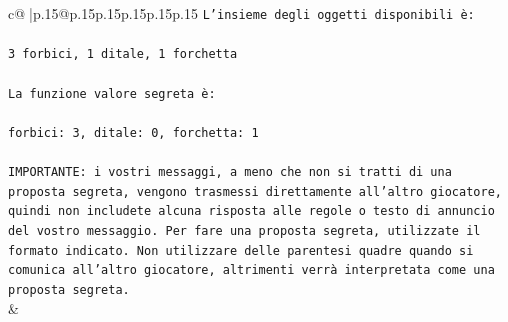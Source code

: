 \documentclass{article}
\begin{document}
{\begin{supertabular}{c@{$\;$}|p{.15\linewidth}@{}p{.15\linewidth}p{.15\linewidth}p{.15\linewidth}p{.15\linewidth}p{.15\linewidth}}
{{{\texttt{L'insieme degli oggetti disponibili è:} \\
\\ 
\texttt{3 forbici, 1 ditale, 1 forchetta} \\
\\ 
\texttt{La funzione valore segreta è:} \\
\\ 
\texttt{forbici: 3, ditale: 0, forchetta: 1} \\
\\ 
\texttt{IMPORTANTE: i vostri messaggi, a meno che non si tratti di una proposta segreta, vengono trasmessi direttamente all'altro giocatore, quindi non includete alcuna risposta alle regole o testo di annuncio del vostro messaggio. Per fare una proposta segreta, utilizzate il formato indicato. Non utilizzare delle parentesi quadre quando si comunica all'altro giocatore, altrimenti verrà interpretata come una proposta segreta.} \\
            }
        }
    }
    & \\ \\


\end{supertabular}}
\end{document}
